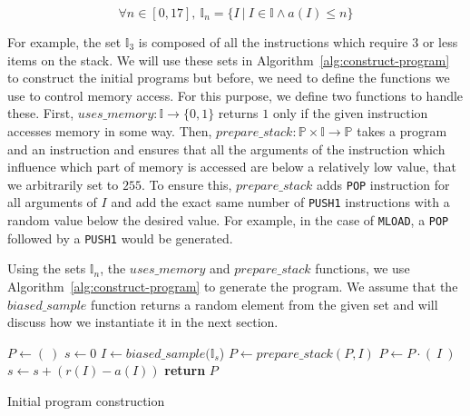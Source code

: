 \begin{equation}
  \label{eq:instr-args}
  \forall n \in [0, 17],~ \mathbb{I}_n = \{I~|~I\in \mathbb{I} \land a(I) \leq n\}
\end{equation}

For example, the set $\mathbb{I}_3$ is composed of all the instructions which require $3$ or less items on the stack. We will use these sets in Algorithm~\ref{alg:construct-program} to construct the initial programs but before, we need to define the functions we use to control memory access. For this purpose, we define two functions to handle these. First, $uses\_memory : \mathbb{I} \rightarrow \{0, 1\}$ returns $1$ only if the given instruction accesses memory in some way. Then, $prepare\_stack: \mathbb{P}\times\mathbb{I}\rightarrow \mathbb{P}$ takes a program and an instruction and ensures that all the arguments of the instruction which influence which part of memory is accessed are below a relatively low value, that we arbitrarily set to $255$. To ensure this, $prepare\_stack$ adds \lstinline{POP} instruction for all arguments of $I$ and add the exact same number of \lstinline{PUSH1} instructions with a random value below the desired value. For example, in the case of \lstinline{MLOAD}, a \lstinline{POP} followed by a \lstinline{PUSH1} would be generated.

Using the sets $\mathbb{I}_n$, the $uses\_memory$ and $prepare\_stack$ functions, we use Algorithm~\ref{alg:construct-program} to generate the program. We assume that the $biased\_sample$ function returns a random element from the given set and will discuss how we instantiate it in the next section.

\begin{algorithm}
  \begin{algorithmic}
    \State $P \gets (~)$
    \State $s\gets 0$
      \State $I \gets biased\_sample(\mathbb{I}_s$)
        \State $P \gets prepare\_stack(P, I)$
      \EndIf
      \State $P \gets P \cdot (~I~)$
      \State $s \gets s + (r(I) - a(I))$
    \EndFor
    \State \textbf{return} $P$
    \EndFunction
  \end{algorithmic}
  \caption{Initial program construction}
  \label{alg:construct-program}
\end{algorithm}


